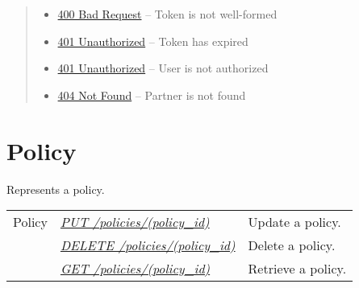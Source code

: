 \documentclass[letterpaper,10pt,english]{sphinxmanual}
\begin{document}
\begin{fulllineitems}
\begin{quote}
\begin{description}
\begin{itemize}
\item {} 
\href{http://www.w3.org/Protocols/rfc2616/rfc2616-sec10.html\#sec10.4.1}{400 Bad Request} -- Token is not well-formed

\item {} 
\href{http://www.w3.org/Protocols/rfc2616/rfc2616-sec10.html\#sec10.4.2}{401 Unauthorized} -- Token has expired

\item {} 
\href{http://www.w3.org/Protocols/rfc2616/rfc2616-sec10.html\#sec10.4.2}{401 Unauthorized} -- User is not authorized

\item {} 
\href{http://www.w3.org/Protocols/rfc2616/rfc2616-sec10.html\#sec10.4.5}{404 Not Found} -- Partner is not found

\end{itemize}

\end{description}\end{quote}

\end{fulllineitems}



\section{Policy}
\label{\detokenize{resources/policy::doc}}\label{\detokenize{resources/policy:id1}}\label{\detokenize{resources/policy:policy}}
Represents a policy.

\noindent\begin{tabulary}{\linewidth}{|L|L|L|}
\hline
{}\relax &\relax &\relax \\
\hline
Policy
&
{\hyperref[\detokenize{resources/policy:put--policies-(policy_id)}]{\emph{PUT /policies/(policy\_id)}}}
&
Update a policy.
\\
\hline&
{\hyperref[\detokenize{resources/policy:delete--policies-(policy_id)}]{\emph{DELETE /policies/(policy\_id)}}}
&
Delete a policy.
\\
\hline&
{\hyperref[\detokenize{resources/policy:get--policies-(policy_id)}]{\emph{GET /policies/(policy\_id)}}}
&
Retrieve a policy.
\\
\hline\end{tabulary}


\begin{DUlineblock}{0em}
\item[] 
\end{DUlineblock}
\end{document}
